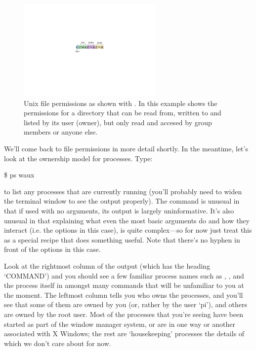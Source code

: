 \begin{figure}
\centerline{\includegraphics[width=7cm]{images/filepermissions}}
\caption{Unix file permissions as shown with . In this example shows the permissions for a directory that can be read from, written to and listed by its user (owner), but only read and accesed by group members or anyone else.}\label{figure:fileperms}
\end{figure}

We'll come back to file permissions in more detail shortly. In the meantime, let's look at the ownership model for processes. Type:

\begin{ttoutenv}
\$ ps waux
\end{ttoutenv}

to list any processes that are currently running (you'll probably need to widen the terminal window to see the output properly). The  command is unusual in that if used with no arguments, its output is largely uninformative. It's also unusual in that explaining what even the most basic arguments do and how they interact (i.e. the  options in this case), is quite complex---so for now just treat this as a special recipe that does something useful. Note that there's no hyphen in front of the options in this case.

Look at the rightmost column of the output (which has the heading `COMMAND') and you should see a few familiar process names such as , , and the  process itself in amongst many commands that will be unfamiliar to you at the moment. The leftmost column tells you who owns the processes, and you'll see that some of them are owned by you (or, rather by the user `pi'), and others are owned by the root user. Most of the processes that you're seeing have been started as part of the window manager system, or are in one way or another associated with X Windows; the rest are `housekeeping' processes the details of which we don't care about for now.

